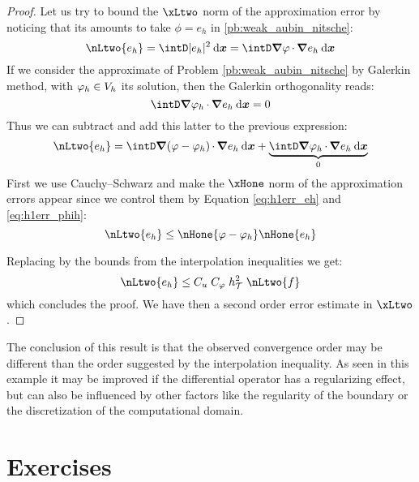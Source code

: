\begin{proof}
\medskip
Let us try to bound the $\xLtwo$ norm of the approximation error by noticing that its amounts to take $\phi = e_h$ in \eqref{pb:weak_aubin_nitsche}:
\begin{equation*}
\nLtwo{e_h} = \intD |e_h|^2 \dxx = \intD \Grad \varphi\xDot \Grad e_h\dxx
\end{equation*}
If we consider the approximate of Problem \eqref{pb:weak_aubin_nitsche} by Galerkin method, with $\varphi_h \in {{V}}_h$ its solution, then the Galerkin orthogonality reads:
\begin{equation*}
\intD \Grad \varphi_h\xDot \Grad e_h\dxx  = 0
\end{equation*}
Thus we can subtract and add this latter to the previous expression:
\begin{equation*}
\nLtwo{e_h} = \intD \Grad (\varphi - \varphi_h)\xDot \Grad e_h\dxx + \underbrace{\intD \Grad \varphi_h\xDot \Grad e_h\dxx}_{0}
\end{equation*}
First we use Cauchy--Schwarz and make the $\xHone$ norm of the approximation errors appear since we control them by Equation \eqref{eq:h1err_eh} and \eqref{eq:h1err_phih}:
\begin{equation*}
\nLtwo{e_h} \leq \nHone{\varphi - \varphi_h} \nHone{e_h}
\end{equation*}

\medskip
Replacing by the bounds from the interpolation inequalities we get:
\begin{equation*}
\nLtwo{e_h} \leq C_u\;C_\varphi\;\sizeT^2\;\nLtwo{f}
\end{equation*}
which concludes the proof. We have then a second order error estimate in $\xLtwo$.
\end{proof}

The conclusion of this result is that the observed convergence order may be different than the order suggested by the interpolation inequality.
As seen in this example it may be improved if the differential operator has a regularizing effect, but can also be influenced by other factors like the regularity of the boundary or the discretization of the computational domain.

\newpage
\section{Exercises}


